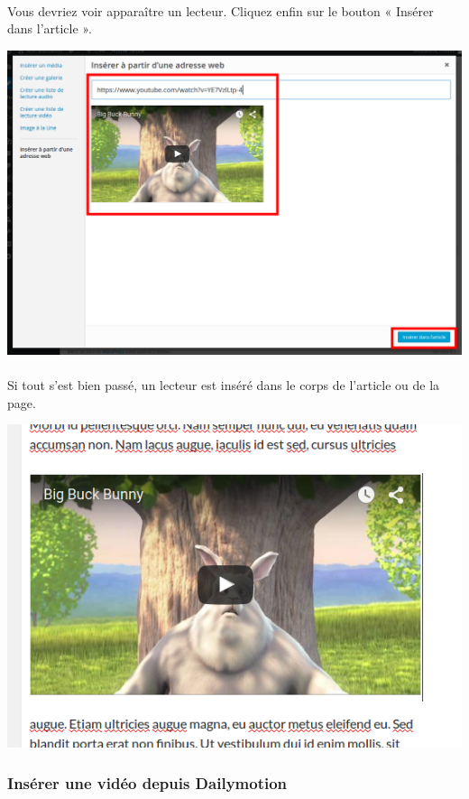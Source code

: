 \documentclass[10pt,a4paper]{article}
\begin{document}
\paragraph{}Vous devriez voir apparaître un lecteur. Cliquez enfin sur le bouton « Insérer dans l'article ».
\begin{center}
\includegraphics[scale=0.25]{img/0135.png}
\end{center}
\paragraph{}Si tout s'est bien passé, un lecteur est inséré dans le corps de l'article ou de la page.
\begin{center}
\includegraphics[scale=0.3]{img/0136.png}
\end{center}
\newpage
\subsubsection{Insérer une vidéo depuis Dailymotion}
\end{document}
